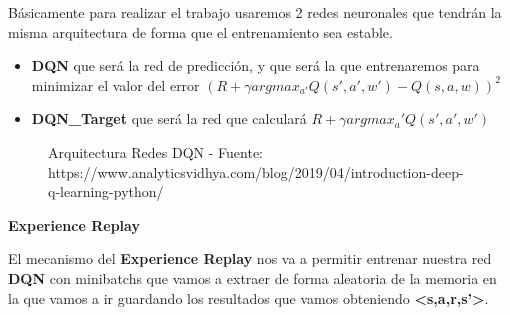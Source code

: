 \documentclass[
  a4paper,
  DIV=11,
  numbers=noendperiod]{scrreprt}
\providecommand{\tightlist}{%
  \setlength{\itemsep}{0pt}\setlength{\parskip}{0pt}}\usepackage{longtable,booktabs,array}
\begin{document}
Básicamente para realizar el trabajo usaremos 2 redes neuronales que
tendrán la misma arquitectura de forma que el entrenamiento sea estable.

\begin{itemize}
\tightlist
\item
  \textbf{DQN} que será la red de predicción, y que será la que
  entrenaremos para minimizar el valor del error
  \((R+\gamma argmax_{a'}Q(s',a',w')-Q(s,a,w))^2\)
\item
  \textbf{DQN\_Target} que será la red que calculará
  \(R+\gamma argmax_a'Q(s',a',w')\)
\end{itemize}

\begin{figure}


\caption{\label{fig-rl_rl_arquitectura_redes}Arquitectura Redes DQN -
Fuente:
https://www.analyticsvidhya.com/blog/2019/04/introduction-deep-q-learning-python/}

\end{figure}%

\textbf{Experience Replay}

El mecanismo del \textbf{Experience Replay} nos va a permitir entrenar
nuestra red \textbf{DQN} con minibatchs que vamos a extraer de forma
aleatoria de la memoria en la que vamos a ir guardando los resultados
que vamos obteniendo \textbf{\textless s,a,r,s'\textgreater{}}.
\end{document}
